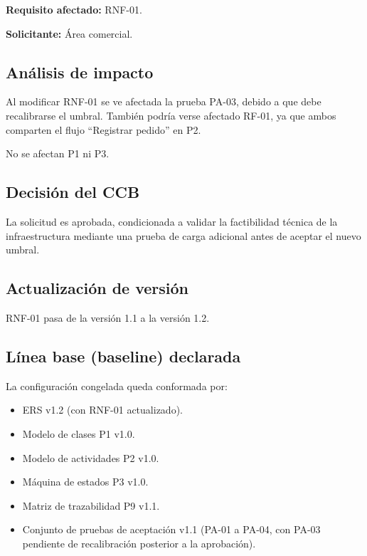 \documentclass[12pt,a4paper]{article}
\begin{document}
\textbf{Requisito afectado:} RNF-01.

\medskip

\textbf{Solicitante:} Área comercial.

\subsection{Análisis de impacto}

Al modificar RNF-01 se ve afectada la prueba PA-03, debido a que debe recalibrarse el umbral. También podría verse afectado RF-01, ya que ambos comparten el flujo ``Registrar pedido'' en P2.

No se afectan P1 ni P3.

\subsection{Decisión del CCB}

La solicitud es aprobada, condicionada a validar la factibilidad técnica de la infraestructura mediante una prueba de carga adicional antes de aceptar el nuevo umbral.

\subsection{Actualización de versión}

RNF-01 pasa de la versión 1.1 a la versión 1.2.

\subsection{Línea base (baseline) declarada}

La configuración congelada queda conformada por:

\begin{itemize}
    \item ERS v1.2 (con RNF-01 actualizado).
    \item Modelo de clases P1 v1.0.
    \item Modelo de actividades P2 v1.0.
    \item Máquina de estados P3 v1.0.
    \item Matriz de trazabilidad P9 v1.1.
    \item Conjunto de pruebas de aceptación v1.1 (PA-01 a PA-04, con PA-03 pendiente de recalibración posterior a la aprobación).
\end{itemize}

\end{document}
